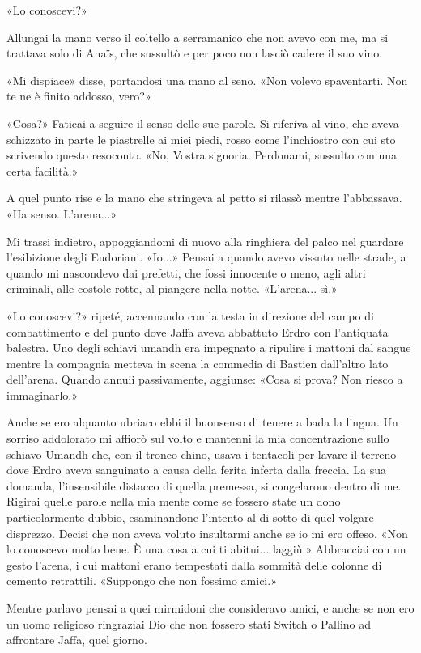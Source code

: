 «Lo conoscevi?»

Allungai la mano verso il coltello a serramanico che non avevo con me,
ma si trattava solo di Anaïs, che sussultò e per poco non lasciò cadere
il suo vino.

«Mi dispiace» disse, portandosi una mano al seno. «Non volevo
spaventarti. Non te ne è finito addosso, vero?»

«Cosa?» Faticai a seguire il senso delle sue parole. Si riferiva al
vino, che aveva schizzato in parte le piastrelle ai miei piedi, rosso
come l'inchiostro con cui sto scrivendo questo resoconto. «No, Vostra
signoria. Perdonami, sussulto con una certa facilità.»

A quel punto rise e la mano che stringeva al petto si rilassò mentre
l'abbassava. «Ha senso. L'arena...»

Mi trassi indietro, appoggiandomi di nuovo alla ringhiera del palco nel
guardare l'esibizione degli Eudoriani. «Io...» Pensai a quando avevo
vissuto nelle strade, a quando mi nascondevo dai prefetti, che fossi
innocente o meno, agli altri criminali, alle costole rotte, al piangere
nella notte. «L'arena... sì.»

«Lo conoscevi?» ripeté, accennando con la testa in direzione del campo
di combattimento e del punto dove Jaffa aveva {abbattuto} Erdro con
l'antiquata balestra. Uno degli schiavi umandh era impegnato a ripulire
i mattoni dal sangue mentre la compagnia metteva in scena la commedia di
Bastien dall'altro lato dell'arena. Quando annuii passivamente,
aggiunse: «Cosa si prova? Non riesco a immaginarlo.»

Anche se ero alquanto ubriaco ebbi il buonsenso di tenere a bada la
lingua. Un sorriso addolorato mi affiorò sul volto e mantenni la mia
concentrazione sullo schiavo Umandh che, con il tronco chino, usava i
tentacoli per lavare il terreno dove Erdro aveva sanguinato a causa
della ferita inferta dalla freccia. La sua domanda, l'insensibile
distacco di quella premessa, si congelarono dentro di me. Rigirai quelle
parole nella mia mente come se fossero state un dono particolarmente
dubbio, esaminandone l'intento al di sotto di quel volgare disprezzo.
Decisi che non aveva voluto insultarmi anche se io mi ero offeso. «Non
lo conoscevo molto bene. È una cosa a cui ti abitui... laggiù.»
Abbracciai con un gesto l'arena, i cui mattoni erano tempestati dalla
sommità delle colonne di cemento retrattili. «Suppongo che non fossimo
amici.»

Mentre parlavo pensai a quei mirmidoni che consideravo amici, e anche se
non ero un uomo religioso ringraziai Dio che non fossero stati Switch o
Pallino ad affrontare Jaffa, quel giorno.

